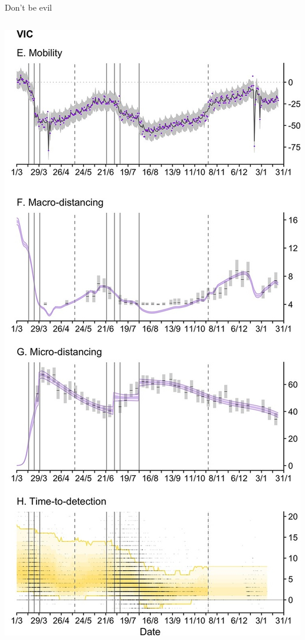 \documentclass[
  ignorenonframetext,
]{beamer}
\begin{document}
\begin{frame}{Don't be evil}
\begin{columns}[T]
\begin{column}{0.4\textwidth}
\includegraphics{images/lax_78089_elife-78089-fig3-v2.tif.jpg}
\end{column}
\end{columns}
\end{frame}
\end{document}
